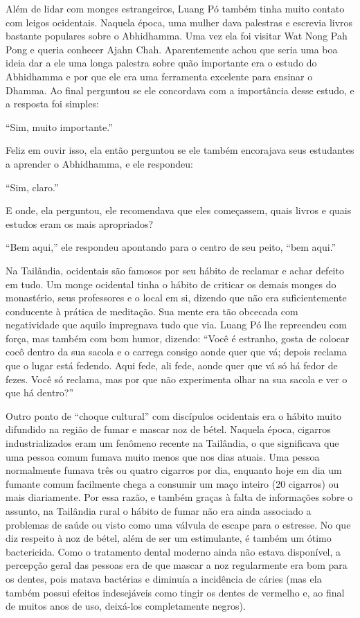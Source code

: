 Além de lidar com monges estrangeiros, Luang Pó também tinha muito
contato com leigos ocidentais. Naquela época, uma mulher dava palestras e escrevia livros bastante populares sobre o
Abhidhamma. Uma vez ela foi visitar Wat Nong Pah Pong e queria conhecer
Ajahn Chah. Aparentemente achou que seria uma boa ideia dar a ele uma
longa palestra sobre quão importante era o estudo do Abhidhamma e por
que ele era uma ferramenta excelente para ensinar o Dhamma. Ao final
perguntou se ele concordava com a importância desse estudo, e a resposta
foi simples:

``Sim, muito importante.''

Feliz em ouvir isso, ela então perguntou se ele também encorajava seus
estudantes a aprender o Abhidhamma, e ele respondeu:

``Sim, claro.''

E onde, ela perguntou, ele recomendava que eles começassem, quais livros
e quais estudos eram os mais apropriados?

``Bem aqui,'' ele respondeu apontando para o centro de seu peito, ``bem
aqui.''

Na Tailândia, ocidentais são famosos por seu hábito de reclamar e achar
defeito em tudo. Um monge ocidental tinha o hábito de criticar os demais
monges do monastério, seus professores e o local em si, dizendo que não
era suficientemente conducente à prática de meditação. Sua mente era tão
obcecada com negatividade que aquilo impregnava tudo que via. Luang Pó
lhe repreendeu com força, mas também com bom humor, dizendo: ``Você é
estranho, gosta de colocar cocô dentro da sua sacola e o carrega consigo
aonde quer que vá; depois reclama que o lugar está fedendo. Aqui fede,
ali fede, aonde quer que vá só há fedor de fezes. Você só reclama, mas
por que não experimenta olhar na sua sacola e ver o que há dentro?''

Outro ponto de ``choque cultural'' com discípulos ocidentais era o
hábito muito difundido na região de fumar e mascar noz de bétel. Naquela
época, cigarros industrializados eram um fenômeno recente na Tailândia,
o que significava que uma pessoa comum fumava muito menos que nos dias
atuais. Uma pessoa normalmente fumava três ou quatro cigarros por dia,
enquanto hoje em dia um fumante comum facilmente chega a consumir um
maço inteiro (20 cigarros) ou mais diariamente. Por essa razão, e também
graças à falta de informações sobre o assunto, na Tailândia rural o
hábito de fumar não era ainda associado a problemas de saúde ou visto
como uma válvula de escape para o estresse. No que diz respeito à noz de
bétel, além de ser um estimulante, é também um ótimo bactericida. Como o
tratamento dental moderno ainda não estava disponível, a percepção geral
das pessoas era de que mascar a noz regularmente era bom para os dentes,
pois matava bactérias e diminuía a incidência de cáries (mas ela também
possui efeitos indesejáveis como tingir os dentes de vermelho e, ao
final de muitos anos de uso, deixá-los completamente negros).

